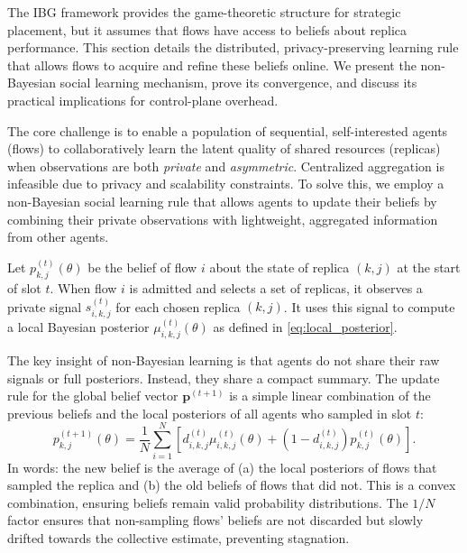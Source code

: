 \documentclass[journal]{IEEEtran}
\theoremstyle{plain}
\theoremstyle{definition}
\theoremstyle{remark}
\begin{document}
The IBG framework provides the game-theoretic structure for strategic placement, but it assumes that flows have access to beliefs about replica performance. This section details the distributed, privacy-preserving learning rule that allows flows to acquire and refine these beliefs online. We present the non-Bayesian social learning mechanism, prove its convergence, and discuss its practical implications for control-plane overhead.

The core challenge is to enable a population of sequential, self-interested agents (flows) to collaboratively learn the latent quality of shared resources (replicas) when observations are both \emph{private} and \emph{asymmetric}. Centralized aggregation is infeasible due to privacy and scalability constraints. To solve this, we employ a non-Bayesian social learning rule that allows agents to update their beliefs by combining their private observations with lightweight, aggregated information from other agents.

Let $p_{k,j}^{(t)}(\theta)$ be the belief of flow $i$ about the state of replica $(k,j)$ at the start of slot $t$. When flow $i$ is admitted and selects a set of replicas, it observes a private signal $s_{i,k,j}^{(t)}$ for each chosen replica $(k,j)$. It uses this signal to compute a local Bayesian posterior $\mu_{i,k,j}^{(t)}(\theta)$ as defined in \eqref{eq:local_posterior}.

The key insight of non-Bayesian learning is that agents do not share their raw signals or full posteriors. Instead, they share a compact summary. The update rule for the global belief vector $\mathbf{p}^{(t+1)}$ is a simple linear combination of the previous beliefs and the local posteriors of all agents who sampled in slot $t$:
\begin{equation}
p_{k,j}^{(t+1)}(\theta) = \frac{1}{N} \sum_{i=1}^{N} \left[ d_{i,k,j}^{(t)} \mu_{i,k,j}^{(t)}(\theta) + (1 - d_{i,k,j}^{(t)}) p_{k,j}^{(t)}(\theta) \right].
\label{eq:learning_update}
\end{equation}
In words: the new belief is the average of (a) the local posteriors of flows that sampled the replica and (b) the old beliefs of flows that did not. This is a convex combination, ensuring beliefs remain valid probability distributions. The $1/N$ factor ensures that non-sampling flows' beliefs are not discarded but slowly drifted towards the collective estimate, preventing stagnation.
\end{document}
